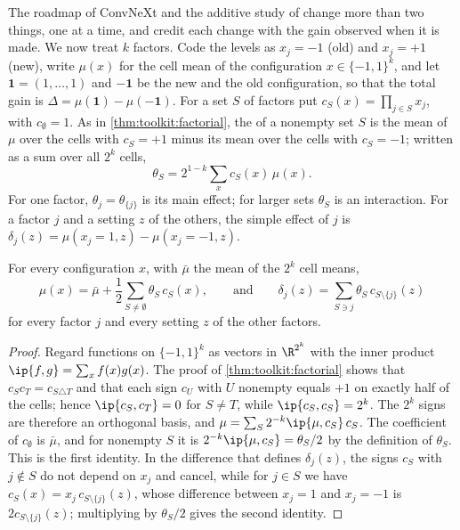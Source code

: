 \begin{refsection}
The roadmap of ConvNeXt and the additive study of \textcite{BelloEtAl2021} change more than two things, one at a time, and credit each change with the gain observed when it is made. We now treat $k$ factors. Code the levels as $x_j=-1$ (old) and $x_j=+1$ (new), write $\mu(x)$ for the cell mean of the configuration $x\in\{-1,1\}^k$, and let $\mathbf 1=(1,\dots,1)$ and $-\mathbf 1$ be the new and the old configuration, so that the total gain is $\Delta=\mu(\mathbf 1)-\mu(-\mathbf 1)$. For a set $S$ of factors put $c_S(x)=\prod_{j\in S}x_j$, with $c_\emptyset=1$. As in \cref{thm:toolkit:factorial}, the  of a nonempty set $S$ is the mean of $\mu$ over the cells with $c_S=+1$ minus its mean over the cells with $c_S=-1$; written as a sum over all $2^k$ cells,
\[
\theta_S=2^{1-k}\sum_{x}c_S(x)\,\mu(x).
\]
For one factor, $\theta_j=\theta_{\{j\}}$ is its main effect; for larger sets $\theta_S$ is an interaction. For a factor $j$ and a setting $z$ of the others, the simple effect of $j$ is $\delta_j(z)=\mu(x_j{=}1,z)-\mu(x_j{=}{-1},z)$.

\begin{lemma}[Expansion]\label{lem:confounding:expansion}
For every configuration $x$, with $\bar\mu$ the mean of the $2^k$ cell means,
\[
\mu(x)=\bar\mu+\frac12\sum_{S\ne\emptyset}\theta_S\,c_S(x),
\qquad\text{and}\qquad
\delta_j(z)=\sum_{S\ni j}\theta_S\,c_{S\setminus\{j\}}(z)
\]
for every factor $j$ and every setting $z$ of the other factors.
\end{lemma}

\begin{proof}
Regard functions on $\{-1,1\}^k$ as vectors in $\R^{2^k}$ with the inner product $\ip{f,g}=\sum_xf(x)g(x)$. The proof of \cref{thm:toolkit:factorial} shows that $c_Sc_T=c_{S\triangle T}$ and that each sign $c_U$ with $U$ nonempty equals $+1$ on exactly half of the cells; hence $\ip{c_S,c_T}=0$ for $S\ne T$, while $\ip{c_S,c_S}=2^k$. The $2^k$ signs are therefore an orthogonal basis, and $\mu=\sum_S2^{-k}\ip{\mu,c_S}\,c_S$. The coefficient of $c_\emptyset$ is $\bar\mu$, and for nonempty $S$ it is $2^{-k}\ip{\mu,c_S}=\theta_S/2$ by the definition of $\theta_S$. This is the first identity. In the difference that defines $\delta_j(z)$, the signs $c_S$ with $j\notin S$ do not depend on $x_j$ and cancel, while for $j\in S$ we have $c_S(x)=x_j\,c_{S\setminus\{j\}}(z)$, whose difference between $x_j=1$ and $x_j=-1$ is $2c_{S\setminus\{j\}}(z)$; multiplying by $\theta_S/2$ gives the second identity.
\end{proof}


\end{refsection}
